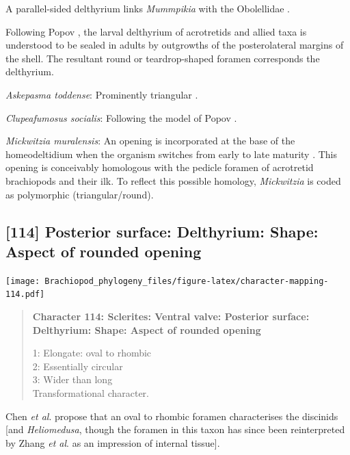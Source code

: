 \documentclass[openany]{book}
\begin{document}
A parallel-sided delthyrium links \emph{Mummpikia} with the Obolellidae
\citep{Balthasar2008iMummpikia}.

Following Popov \citeyearpar{Popov1992TheCambrian}, the larval
delthyrium of acrotretids and allied taxa is understood to be sealed in
adults by outgrowths of the posterolateral margins of the shell. The
resultant round or teardrop-shaped foramen corresponds the delthyrium.

\hypertarget{Askepasma_toddense-coding-113}{}
\emph{Askepasma toddense}: Prominently triangular \citep[see][fig.
2]{Topper2013Theoldest}.

\hypertarget{Clupeafumosus_socialis-coding-113}{}
\emph{Clupeafumosus socialis}: Following the model of Popov
\citeyearpar{Popov1992TheCambrian}.

\hypertarget{Mickwitzia_muralensis-coding-113}{}
\emph{Mickwitzia muralensis}: An opening is incorporated at the base of
the homeodeltidium when the organism switches from early to late
maturity \citep[fig. 10 in][]{Balthasar2004Shellstructure}. This opening
is conceivably homologous with the pedicle foramen of acrotretid
brachiopods and their ilk. To reflect this possible homology,
\emph{Mickwitzia} is coded as polymorphic (triangular/round).

\subsection*{{[}114{]} Posterior surface: Delthyrium: Shape: Aspect of
rounded
opening}\label{posterior-surface-delthyrium-shape-aspect-of-rounded-opening}

\texttt{[image: Brachiopod\_phylogeny\_files/figure-latex/character-mapping-114.pdf]}

\begin{quote}
\textbf{Character 114: Sclerites: Ventral valve: Posterior surface:
Delthyrium: Shape: Aspect of rounded opening}

1: Elongate: oval to rhombic\\
2: Essentially circular\\
3: Wider than long\\
Transformational character.
\end{quote}

Chen \emph{et al}. \citeyearpar{Chen2007Reinterpretationof} propose that
an oval to rhombic foramen characterises the discinids {[}and
\emph{Heliomedusa}, though the foramen in this taxon has since been
reinterpreted by Zhang \emph{et al}.
\citeyearpar{Zhang2009Architectureand} as an impression of internal
tissue{]}.
\end{document}
